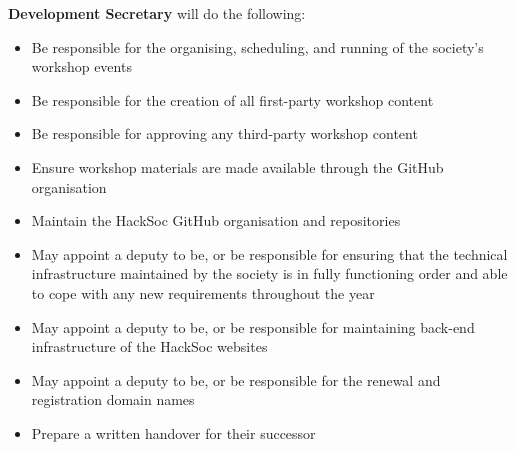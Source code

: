 \begin{subclause}
  \textbf{Development Secretary} will do the following: 
  \begin{itemize}[label=--,topsep=0em,itemsep=0em]
    \item Be responsible for the organising, scheduling, and running of the society's workshop events
    \item Be responsible for the creation of all first-party workshop content
    \item Be responsible for approving any third-party workshop content
    \item Ensure workshop materials are made available through the GitHub organisation
    \item Maintain the HackSoc GitHub organisation and repositories
    \item May appoint a deputy to be, or be responsible for ensuring that the technical infrastructure maintained by the society is in fully functioning order and able to cope with any new requirements throughout the year
    \item May appoint a deputy to be, or be responsible for maintaining back-end infrastructure of the HackSoc websites
    \item May appoint a deputy to be, or be responsible for the renewal and registration domain names
    \item Prepare a written handover for their successor
  \end{itemize}
\end{subclause}
